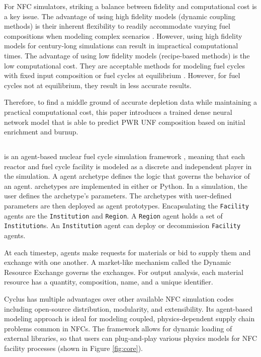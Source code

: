 For \gls{NFC} simulators, striking a balance between fidelity 
and computational cost is a key issue. 
The advantage of using high fidelity models (dynamic coupling 
methods) is their inherent flexibility 
to readily accommodate varying fuel compositions 
when modeling complex scenarios \cite{sunny_transition_2015}. 
However, using high fidelity models for century-long simulations 
can result in impractical computational times. 
The advantage of using low fidelity models (recipe-based methods)
is the low computational cost. 
They are acceptable methods for modeling fuel cycles with fixed input 
composition or fuel cycles at equilibrium \cite{sunny_transition_2015}. 
However, for fuel cycles not at equilibrium, they result in less 
accurate results. 

Therefore, to find a middle ground of accurate depletion data while 
maintaining a practical computational cost, this paper introduces 
a trained dense neural network model that is able to predict \gls{PWR} \gls{UNF}
composition based on initial enrichment and burnup. 

\subsection{\Cyclus}

\Cyclus is an agent-based nuclear fuel cycle simulation framework 
\cite{huff_fundamental_2016}, meaning
that each reactor and fuel cycle facility is modeled as a discrete and independent
player in the simulation.
A \Cyclus agent archetype defines the logic that governs the behavior
of an agent. 
\Cyclus archetypes are implemented in  either \CC  or Python.
In a simulation, the user defines the archetype's
parameters. The archetypes with user-defined parameters are then deployed
as agent prototypes.  Encapsulating the \texttt{Facility} agents are the \texttt{Institution} and \texttt{Region}.
A \texttt{Region} agent holds a set of \texttt{Institution}s. 
An \texttt{Institution} agent can deploy or decommission \texttt{Facility} agents.

At each timestep,
agents make requests for materials or bid to supply them and exchange
with one another. A market-like mechanism called the Dynamic Resource Exchange
\cite{gidden_methodology_2016} governs the exchanges.
For output analysis, each material resource has a quantity, composition, name, and a unique identifier.

Cyclus has multiple advantages over other available
\gls{NFC} simulation codes including open-source distribution, modularity,
and extensibility. Its agent-based modeling approach
is ideal for modeling coupled, physics-dependent
supply chain problems common in \glspl{NFC}.
The framework allows for dynamic loading of 
external libraries, so that users can plug-and-play
various physics models for \gls{NFC} facility processes (shown in Figure \ref{fig:core}).


